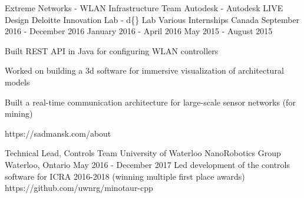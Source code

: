 \begin{cventries}

\cventrylink
{Extreme Networks - WLAN Infrastructure Team
 \newline {\vspace{-.20mm}}
 Autodesk - Autodesk LIVE Design
 \newline {\vspace{-.75mm}}
 Deloitte Innovation Lab - d\{\} Lab}
{Various Internships}
{Canada}
{September 2016 - December 2016
 \newline {\vspace{-1mm}}
 January 2016 - April 2016
 \newline {\vspace{-1mm}}
 May 2015 - August 2015} %
{ %
\begin{cvitems}
\item {Built REST API in Java for configuring WLAN controllers}
\item {Worked on building a 3d software for immersive visualization of architectural models}
\item {Built a real-time communication architecture for large-scale sensor networks (for mining)}
\end{cvitems}
}
{https://sadmansk.com/about}


\cventrylink
{Technical Lead, Controls Team}
{University of Waterloo NanoRobotics Group}
{Waterloo, Ontario}
{May 2016 - December 2017} %
{ %
    Led development of the controls software for ICRA 2016-2018 (winning multiple first place awards)
}
{https://github.com/uwnrg/minotaur-cpp}

\end{cventries}
